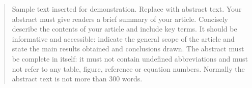\begin{abstract}
Sample text inserted for demonstration. Replace with abstract text. Your abstract must give readers a brief summary of your article. Concisely describe the contents of your article and include key terms. It should be informative and accessible: indicate the general scope of the article and state the main results obtained and conclusions drawn. The abstract must be complete in itself: it must not contain undefined abbreviations and must not refer to any table, figure, reference or equation numbers. Normally the abstract text is not more than 300 words.
\end{abstract}